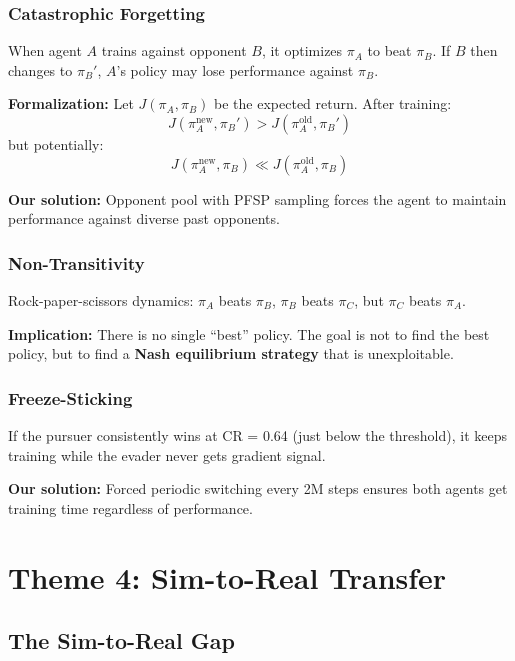 \documentclass[11pt,a4paper]{report}
\begin{document}
\subsubsection{Catastrophic Forgetting}

When agent $A$ trains against opponent $B$, it optimizes $\pi_A$ to beat $\pi_B$. If $B$ then changes to $\pi_B'$, $A$'s policy may lose performance against $\pi_B$.

\textbf{Formalization:} Let $J(\pi_A, \pi_B)$ be the expected return. After training:
\begin{equation}
    J(\pi_A^{\text{new}}, \pi_B') > J(\pi_A^{\text{old}}, \pi_B')
\end{equation}
but potentially:
\begin{equation}
    J(\pi_A^{\text{new}}, \pi_B) \ll J(\pi_A^{\text{old}}, \pi_B)
\end{equation}

\textbf{Our solution:} Opponent pool with PFSP sampling forces the agent to maintain performance against diverse past opponents.

\subsubsection{Non-Transitivity}

Rock-paper-scissors dynamics: $\pi_A$ beats $\pi_B$, $\pi_B$ beats $\pi_C$, but $\pi_C$ beats $\pi_A$.

\textbf{Implication:} There is no single ``best'' policy. The goal is not to find the best policy, but to find a \textbf{Nash equilibrium strategy} that is unexploitable.

\subsubsection{Freeze-Sticking}

If the pursuer consistently wins at CR = 0.64 (just below the threshold), it keeps training while the evader never gets gradient signal.

\textbf{Our solution:} Forced periodic switching every 2M steps ensures both agents get training time regardless of performance.

\section{Theme 4: Sim-to-Real Transfer}

\subsection{The Sim-to-Real Gap}
\end{document}

